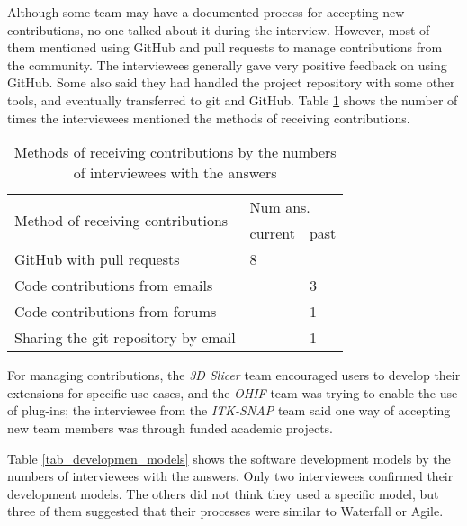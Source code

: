 
Although some team may have a documented process for accepting new contributions, no one talked about it during the interview. However, most of them mentioned using GitHub and pull requests to manage contributions from the community. The interviewees generally gave very positive feedback on using GitHub. Some also said they had handled the project repository with some other tools, and eventually transferred to git and GitHub. Table \ref{tab_method_receive_contributions} shows the number of times the interviewees mentioned the methods of receiving contributions.

\begin{table}[H]
\centering
\begin{tabular}{lll}
\hline
\multirow{2}{*}{Method of receiving contributions} & \multicolumn{2}{l}{Num ans.} \\ \cline{2-3} 
 & current & past \\ \hline
GitHub with pull requests & 8 & \\
Code contributions from emails & & 3 \\
Code contributions from forums & & 1 \\
Sharing the git repository by email & & 1 \\ \hline
\end{tabular}
\caption{\label{tab_method_receive_contributions}Methods of receiving contributions by the numbers of interviewees with the answers}
\end{table}

For managing contributions, the \textit{3D Slicer} team encouraged users to develop their extensions for specific use cases, and the \textit{OHIF} team was trying to enable the use of plug-ins; the interviewee from the \textit{ITK-SNAP} team said one way of accepting new team members was through funded academic projects. 

Table \ref{tab_developmen_models} shows the software development models by the numbers of interviewees with the answers. Only two interviewees confirmed their development models. The others did not think they used a specific model, but three of them suggested that their processes were similar to Waterfall or 
Agile.

